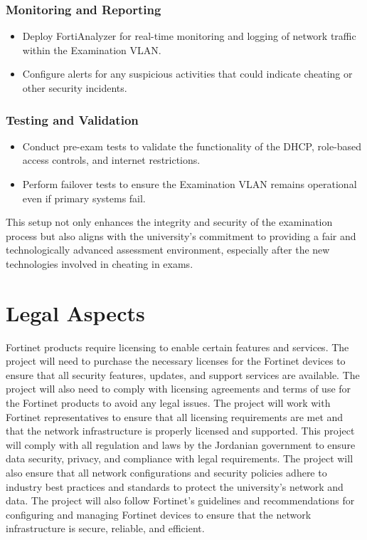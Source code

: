 \documentclass[12pt]{report}
\begin{document}
\subsubsection{Monitoring and Reporting}
\begin{itemize}
    \item Deploy FortiAnalyzer for real-time monitoring and logging of network traffic within the Examination VLAN.
    \item Configure alerts for any suspicious activities that could indicate cheating or other security incidents.
\end{itemize}

\subsubsection{Testing and Validation}
\begin{itemize}
    \item Conduct pre-exam tests to validate the functionality of the DHCP, role-based access controls, and internet restrictions.
    \item Perform failover tests to ensure the Examination VLAN remains operational even if primary systems fail.
\end{itemize}

This setup not only enhances the integrity and security of the examination process but also aligns with the university's commitment to providing a fair and technologically advanced assessment environment, especially after the new technologies involved in cheating in exams.



\section{Legal Aspects}
Fortinet products require licensing to enable certain features and services. The project will need to purchase the necessary licenses for the Fortinet devices to ensure that all security features, updates, and support services are available. The project will also need to comply with licensing agreements and terms of use for the Fortinet products to avoid any legal issues. The project will work with Fortinet representatives to ensure that all licensing requirements are met and that the network infrastructure is properly licensed and supported.
This project will comply with all regulation and laws by the Jordanian government to ensure data security, privacy, and compliance with legal requirements. The project will also ensure that all network configurations and security policies adhere to industry best practices and standards to protect the university's network and data. The project will also follow Fortinet's guidelines and recommendations for configuring and managing Fortinet devices to ensure that the network infrastructure is secure, reliable, and efficient. 
\end{document}
